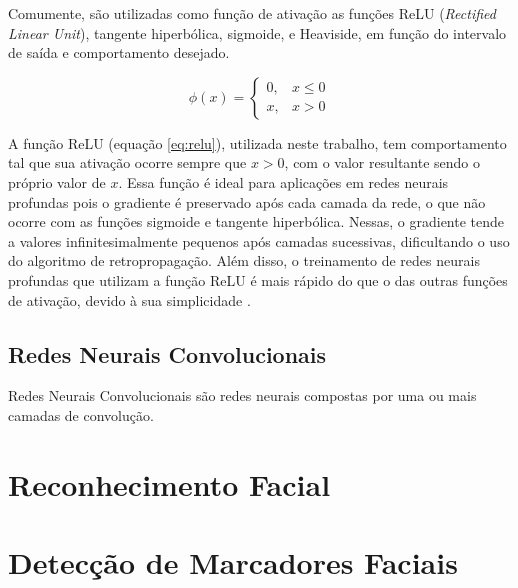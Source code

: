 Comumente, são utilizadas como função de ativação as funções ReLU (\textit{Rectified Linear Unit}), tangente hiperbólica, sigmoide, e Heaviside, em função do intervalo de saída e comportamento desejado.

\begin{equation}\label{eq:relu}
    \phi(x) = \left\{
        \begin{array}{ll}
            0, & x \le 0\\
            x, & x > 0
        \end{array}
    \right.
\end{equation}

A função ReLU (equação \ref{eq:relu}), utilizada neste trabalho, tem comportamento tal que sua ativação ocorre sempre que $x>0$, com o valor resultante sendo o próprio valor de $x$. 
Essa função é ideal para aplicações em redes neurais profundas pois o gradiente é preservado após cada camada da rede, o que não ocorre com as funções sigmoide e tangente hiperbólica.
Nessas, o gradiente tende a valores infinitesimalmente pequenos após camadas sucessivas, dificultando o uso do algoritmo de retropropagação.
Além disso, o treinamento de redes neurais profundas que utilizam a função ReLU é mais rápido do que o das outras funções de ativação, devido à sua simplicidade \cite{krizhevskyImageNetClassificationDeep2017}.

\subsection{Redes Neurais Convolucionais}
\label{sec:convnet}

Redes Neurais Convolucionais são redes neurais compostas por uma ou mais camadas de convolução.

\section{Reconhecimento Facial}
\label{sec:facialrecog}

\section{Detecção de Marcadores Faciais}
\label{sec:faciallm}
